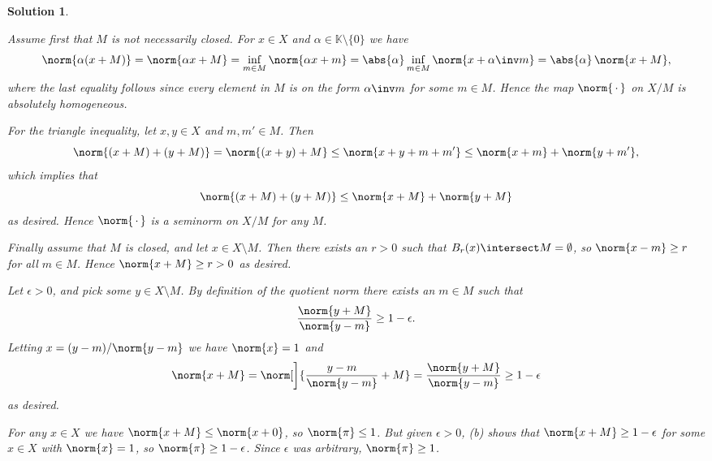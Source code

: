 \documentclass[article, a4paper, 11pt, oneside]{memoir}
\numberwithin{equation}{chapter}
\newcommand{\bbK}{\mathbb{K}}
\theoremstyle{nonumberplain}
\newtheorem{solution}{Solution}
\begin{document}
\begin{solution}
\begin{solutionsec}
	\item Assume first that $M$ is not necessarily closed. For $x \in X$ and $\alpha \in \bbK \setminus \{0\}$ we have
	\begin{equation*}
		\norm{\alpha(x + M)}
			= \norm{\alpha x + M}
			= \inf_{m \in M} \norm{\alpha x + m}
			= \abs{\alpha} \inf_{m \in M} \norm{x + \alpha\inv m}
			= \abs{\alpha} \, \norm{x + M},
	\end{equation*}
	where the last equality follows since every element in $M$ is on the form $\alpha\inv m$ for some $m \in M$. Hence the map $\norm{\,\cdot\,}$ on $X/M$ is absolutely homogeneous.

	For the triangle inequality, let $x,y \in X$ and $m,m' \in M$. Then
	\begin{equation*}
		\norm{(x + M) + (y + M)}
			= \norm{(x + y) + M}
			\leq \norm{x + y + m + m'}
			\leq \norm{x + m} + \norm{y + m'},
	\end{equation*}
	which implies that
	\begin{equation*}
		\norm{(x + M) + (y + M)}
			\leq \norm{x + M} + \norm{y + M}
	\end{equation*}
	as desired. Hence $\norm{\,\cdot\,}$ is a seminorm on $X/M$ for any $M$.

	Finally assume that $M$ is closed, and let $x \in X \setminus M$. Then there exists an $r > 0$ such that $B_r(x) \intersect M = \emptyset$, so $\norm{x - m} \geq r$ for all $m \in M$. Hence $\norm{x + M} \geq r > 0$ as desired.
	
	\item Let $\epsilon > 0$, and pick some $y \in X \setminus M$. By definition of the quotient norm there exists an $m \in M$ such that
	\begin{equation*}
		\frac{\norm{y+M}}{\norm{y-m}}
			\geq 1 - \epsilon.
	\end{equation*}
	Letting $x = (y-m)/\norm{y-m}$ we have $\norm{x} = 1$ and
	\begin{equation*}
		\norm{x + M}
			= \norm[\bigg]{ \frac{y-m}{\norm{y-m}} + M }
			= \frac{\norm{y + M}}{\norm{y-m}}
			\geq 1 - \epsilon
	\end{equation*}
	as desired.
	
	\item For any $x \in X$ we have $\norm{x + M} \leq \norm{x + 0}$, so $\norm{\pi} \leq 1$. But given $\epsilon > 0$, (b) shows that $\norm{x + M} \geq 1 - \epsilon$ for some $x \in X$ with $\norm{x} = 1$, so $\norm{\pi} \geq 1 - \epsilon$. Since $\epsilon$ was arbitrary, $\norm{\pi} \geq 1$.


\end{solutionsec}
\end{solution}
\end{document}
